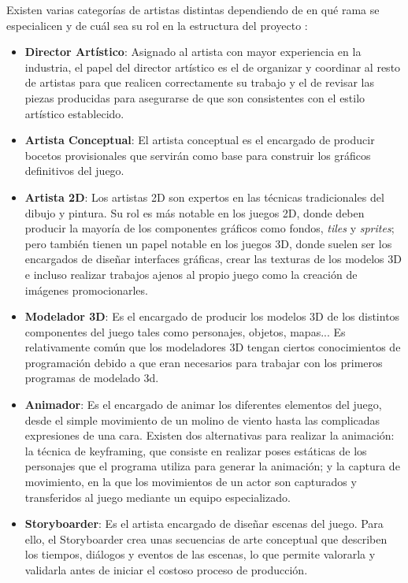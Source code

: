 Existen varias categorías de artistas distintas dependiendo de en qué rama se especialicen y de cuál sea su rol en la estructura del proyecto \cite{development_and_production}:
\begin{itemize}
\item \textbf{Director Artístico}: Asignado al artista con mayor experiencia en la industria, el papel del director artístico es el de organizar y coordinar al resto de artistas para que realicen correctamente su trabajo y el de revisar las piezas producidas para asegurarse de que son consistentes con el estilo artístico establecido.
\item \textbf{Artista Conceptual}: El artista conceptual es el encargado de producir bocetos provisionales que servirán como base para construir los gráficos definitivos del juego.
\item \textbf{Artista 2D}: Los artistas 2D son expertos en las técnicas tradicionales del dibujo y pintura.  Su rol es más notable en los juegos 2D, donde deben producir la mayoría de los componentes gráficos como fondos, \textit{tiles} y \textit{sprites}; pero también tienen un papel notable en los juegos 3D, donde suelen ser los encargados de diseñar interfaces gráficas, crear las texturas de los modelos 3D e incluso realizar trabajos ajenos al propio juego como la creación de imágenes promocionarles.
\item \textbf{Modelador 3D}: Es el encargado de producir los modelos 3D de los distintos componentes del juego tales como personajes, objetos, mapas...  Es relativamente común que los modeladores 3D tengan ciertos conocimientos de programación debido a que eran necesarios para trabajar con los primeros programas de modelado 3d.
\item \textbf{Animador}: Es el encargado de animar los diferentes elementos del juego, desde el simple movimiento de un molino de viento hasta las complicadas expresiones de una cara. Existen dos alternativas para realizar la animación: la técnica de keyframing, que consiste en realizar poses estáticas de los personajes que el programa utiliza para generar la animación; y la captura de movimiento, en la que los movimientos de un actor son capturados y transferidos al juego mediante un equipo especializado.
\item \textbf{Storyboarder}: Es el artista encargado de diseñar escenas del juego. Para ello, el Storyboarder crea unas secuencias de arte conceptual que describen los tiempos, diálogos y eventos de las escenas, lo que permite valorarla y validarla antes de iniciar el costoso proceso de producción.
\end{itemize}

